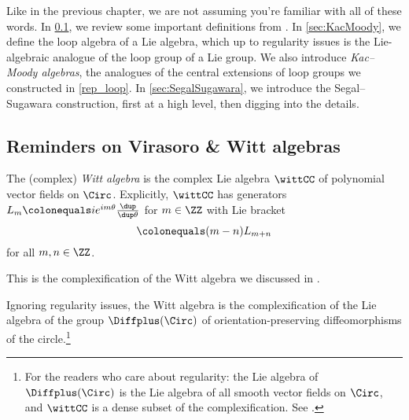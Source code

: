 Like in the previous chapter, we are not assuming you're familiar with all of these words. In
\cref{subsec:reminders}, we review some important definitions from . In \cref{sec:KacMoody},
we define the loop algebra of a Lie algebra, which up to regularity issues is the Lie-algebraic analogue of the
loop group of a Lie group. We also introduce \textit{Kac--Moody algebras}, the analogues of the central extensions
of loop groups we constructed in \cref{rep_loop}. In \cref{sec:SegalSugawara}, we introduce the Segal--Sugawara
construction, first at a high level, then digging into the details.




\subsection{Reminders on Virasoro \& Witt algebras}\label{subsec:reminders}

\begin{definition}
	The (complex) \textit{Witt algebra} is the complex Lie algebra $ \wittCC $ of polynomial vector fields on $
	\Circ $.  Explicitly, $ \wittCC $ has generators $ L_m \colonequals ie^{im\theta} \frac{\dup}{\dup\theta} $ for
	$ m \in \ZZ $ with Lie bracket
	\begin{equation*}
		[L_m,L_n] \colonequals (m-n) L_{m+n}
	\end{equation*}
	for all $ m,n \in \ZZ $.
\end{definition}
This is the complexification of the Witt algebra we discussed in .

\begin{nul}
	Ignoring regularity issues, the Witt algebra is the complexification of the Lie algebra of the group $
	\Diffplus(\Circ) $ of orientation-preserving diffeomorphisms of the circle.\footnote{For the readers who care
	about regularity: the Lie algebra of $\Diffplus(\Circ)$ is the Lie algebra of all smooth vector fields on
	$\Circ$, and $\wittCC$ is a dense subset of the complexification. See \cites[\S 3.3]{loop}{MO:267249}.}
\end{nul}

